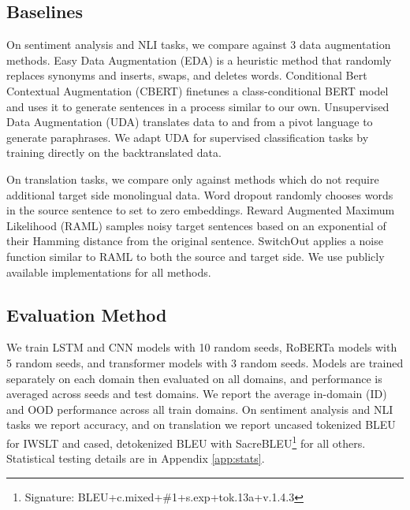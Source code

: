 
\subsection{Baselines}
On sentiment analysis and NLI tasks, we compare against 3 data augmentation methods.
Easy Data Augmentation (EDA) \citep{wei-zou-2019-eda} is a heuristic method that randomly replaces synonyms and inserts, swaps, and deletes words.
Conditional Bert Contextual Augmentation (CBERT) \citep{wu2019conditional} finetunes a class-conditional BERT model and uses it to generate sentences in a process similar to our own.
Unsupervised Data Augmentation (UDA) \citep{xie2020unsupervised} translates data to and from a pivot language to generate paraphrases. We adapt UDA for supervised classification tasks by training directly on the backtranslated data.

On translation tasks, we compare only against methods which do not require additional target side monolingual data.
Word dropout \citep{sennrich-etal-2016-edinburgh} randomly chooses words in the source sentence to set to zero embeddings.
Reward Augmented Maximum Likelihood (RAML) \citep{norouzi2016reward} samples noisy target sentences based on an exponential of their Hamming distance from the original sentence.
SwitchOut \citep{wang-etal-2018-switchout} applies a noise function similar to RAML to both the source and target side.
We use publicly available implementations for all methods. %


\subsection{Evaluation Method}
We train LSTM and CNN models with 10 random seeds, RoBERTa models with 5 random seeds, and transformer models with 3 random seeds.
Models are trained separately on each domain then evaluated on all domains, and performance is averaged across seeds and test domains.
We report the average in-domain (ID) and OOD performance across all train domains.
On sentiment analysis and NLI tasks we report accuracy, and on translation we report uncased tokenized BLEU \citep{papineni2002bleu} for IWSLT and cased, detokenized BLEU  with SacreBLEU\footnote{Signature: BLEU+c.mixed+\#1+s.exp+tok.13a+v.1.4.3} \citep{post-2018-call} for all others.
Statistical testing details are in Appendix \ref{app:stats}.